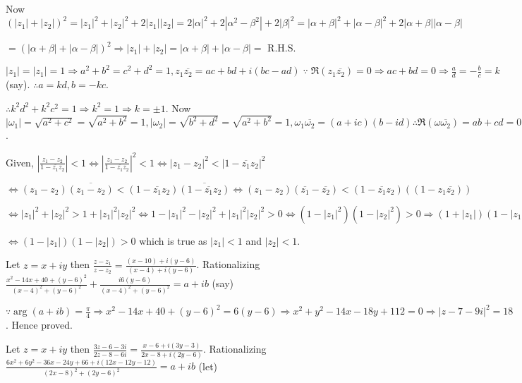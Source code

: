   Now $(|z_1| + |z_2|)^2 = |z_1|^2 + |z_2|^2 + 2|z_1||z_2| = 2|\alpha|^2 + 2|\alpha^2 - \beta^2| +
  2|\beta|^2 = |\alpha + \beta|^2 + |\alpha - \beta|^2 + 2|\alpha + \beta||\alpha -\beta|$

  $= (|\alpha + \beta| + |\alpha - \beta|)^2\Rightarrow |z_1| + |z_2| = |\alpha + \beta| + |\alpha - \beta|
  =$ R.H.S.
\item $|z_1| = |z_1| = 1 \Rightarrow a^2 + b^2 = c^2 + d^2 = 1, z_1\overline{z_2} = ac + bd + i(bc -
  ad)\;\because\;\Re(z_1\overline{z_2}) = 0 \Rightarrow ac + bd = 0 \Rightarrow \frac{a}{d} = -\frac{b}{c} =
  k$ (say). $\therefore a = kd, b = -kc$.

  $\therefore k^2d^2 + k^2c^2 = 1 \Rightarrow k^2 = 1 \Rightarrow k = \pm 1$. Now $|\omega_1| = \sqrt{a^2 +
    c^2} = \sqrt{a^2 + b^2} = 1, |\omega_2| = \sqrt{b^2 + d^2} = \sqrt{a^2 + b^2} = 1,
  \omega_1\overline{\omega_2} = (a + ic)(b - id) \therefore \Re(\omega\overline{\omega_2}) = ab + cd = 0$.
\item Given, $\left|\frac{z_1 - z_2}{1 - \overline{z_1}z_2}\right|< 1\Leftrightarrow \left|\frac{z_1 -
  z_2}{1 - \overline{z_1}z_2}\right|^2 < 1 \Leftrightarrow |z_1 - z_2|^2 < |1 - \overline{z_1}z_2|^2$

  $\Leftrightarrow (z_1 - z_2)\overline{(z_1 - z_2)} < (1 - \overline{z_1}z_2)\overline{(1 -
  \overline{z_1}z_2)} \Leftrightarrow (z_1 - z_2)(\overline{z_1} - \overline{z_2}) < (1 -
  \overline{z_1}z_2)((1 - z_1\overline{z_2}))$

  $\Leftrightarrow |z_1|^2 + |z_2|^2 > 1 + |z_1|^2|z_2|^2 \Leftrightarrow 1 - |z_1|^2 - |z_2|^2 +
  |z_1|^2|z_2|^2 > 0 \Leftrightarrow (1 - |z_1|^2)(1 - |z_2|^2) > 0 \Rightarrow (1 + |z_1|)(1 - |z_1|)(1 +
  |z_2|)(1 - |z_2|) > 0$

  $\Leftrightarrow (1 - |z_1|)(1 - |z_2|) > 0$ which is true as $|z_1| < 1$ and $|z_2| < 1$.
\item Let $z = x + iy$ then $\frac{z - z_1}{z - z_2} = \frac{(x - 10) + i(y - 6)}{(x - 4) + i(y -
  6)}$. Rationalizing $\frac{x^2 - 14x + 40 + (y - 6)^2}{(x - 4)^2 + (y - 6)^2} + \frac{i6(y - 6)}{(x - 4)^2
  + (y - 6)^2} = a + ib$ (say)

  $\because \arg(a + ib) = \frac{\pi}{4}\Rightarrow x^2 - 14x + 40 + (y - 6)^2 = 6(y - 6)\Rightarrow x^2 +
  y^2 - 14x - 18y + 112 = 0 \Rightarrow |z - 7 - 9i|^2 = 18$. Hence proved.
\item Let $z = x + iy$ then $\frac{3z - 6 - 3i}{2z - 8 - 6i} = \frac{x - 6 + i(3y - 3)}{2x - 8 + i(2y -
  6)}$. Rationalizing $\frac{6x^2 + 6y^2 - 36x - 24y + 66 + i(12x - 12y - 12)}{(2x - 8)^2 + (2y - 6)^2} = a
  + ib$ (let)

